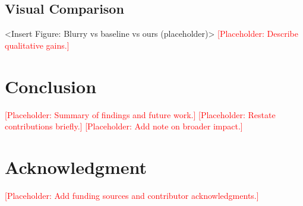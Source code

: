 \documentclass[conference]{IEEEtran}
\newcommand{\placeholder}[1]{\textcolor{red}{[Placeholder: #1]}}
\begin{document}
\subsection{Visual Comparison}
<Insert Figure: Blurry vs baseline vs ours (placeholder)>
\placeholder{Describe qualitative gains.}

\section{Conclusion}
\placeholder{Summary of findings and future work.}
\placeholder{Restate contributions briefly.}
\placeholder{Add note on broader impact.}

\section*{Acknowledgment}
\placeholder{Add funding sources and contributor acknowledgments.}



\end{document}
